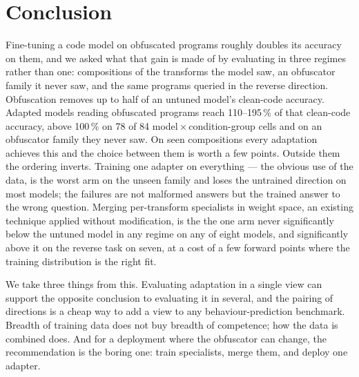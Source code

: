 \section{Conclusion}
\label{sec:conclusion}
Fine-tuning a code model on obfuscated programs roughly doubles its accuracy on them, and we asked
what that gain is made of by evaluating in three regimes rather than one: compositions of the
transforms the model saw, an obfuscator family it never saw, and the same programs queried in the
reverse direction. Obfuscation removes up to half of an untuned model's clean-code accuracy. Adapted models reading
obfuscated programs reach 110--195\,\% of that clean-code accuracy, above 100\,\% on 78 of 84
model\,$\times$\,condition-group cells and on an obfuscator family they never saw. On seen
compositions every adaptation achieves this and the choice between them is worth a few points. Outside them the ordering inverts. Training one adapter on everything --- the obvious use
of the data, is the worst arm on the unseen family and loses the untrained direction on most
models; the failures are not malformed answers but the trained answer to the wrong question. Merging
per-transform specialists in weight space, an existing technique applied without modification, is the
the one arm never significantly below the untuned model in any regime on any of eight models, and
significantly above it on the reverse task on seven, at a cost of a few
forward points where the training distribution is the right fit.

We take three things from this. Evaluating adaptation in a single view can support the opposite
conclusion to evaluating it in several, and the pairing of directions is a cheap way to add a view to
any behaviour-prediction benchmark. Breadth of training data does not buy breadth of competence; how
the data is combined does. And for a deployment where the obfuscator can change, the recommendation
is the boring one: train specialists, merge them, and deploy one adapter.
